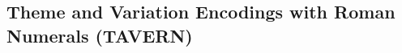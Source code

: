 \subsection{Theme and Variation Encodings with Roman Numerals (TAVERN)}
\label{sec:theme_and_variation_encodings_with_roman_numerals_(tavern)}

